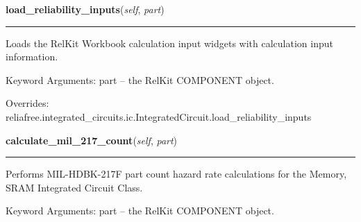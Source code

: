     \vspace{0.5ex}

\hspace{.8\funcindent}\begin{boxedminipage}{\funcwidth}

    \raggedright \textbf{load\_reliability\_inputs}(\textit{self}, \textit{part})

    \vspace{-1.5ex}

    \rule{\textwidth}{0.5\fboxrule}
\setlength{\parskip}{2ex}
    Loads the RelKit Workbook calculation input widgets with calculation
    input information.

    Keyword Arguments: part -- the RelKit COMPONENT object.

\setlength{\parskip}{1ex}
      Overrides: reliafree.integrated\_circuits.ic.IntegratedCircuit.load\_reliability\_inputs

    \end{boxedminipage}

    \label{reliafree:integrated_circuits:memory:MemorySRAM:calculate_mil_217_count}

    \vspace{0.5ex}

\hspace{.8\funcindent}\begin{boxedminipage}{\funcwidth}

    \raggedright \textbf{calculate\_mil\_217\_count}(\textit{self}, \textit{part})

    \vspace{-1.5ex}

    \rule{\textwidth}{0.5\fboxrule}
\setlength{\parskip}{2ex}
    Performs MIL-HDBK-217F part count hazard rate calculations for the 
    Memory, SRAM Integrated Circuit Class.

    Keyword Arguments: part -- the RelKit COMPONENT object.

\setlength{\parskip}{1ex}
    \end{boxedminipage}

    \label{reliafree:integrated_circuits:memory:MemorySRAM:calculate_mil_217_stress}

